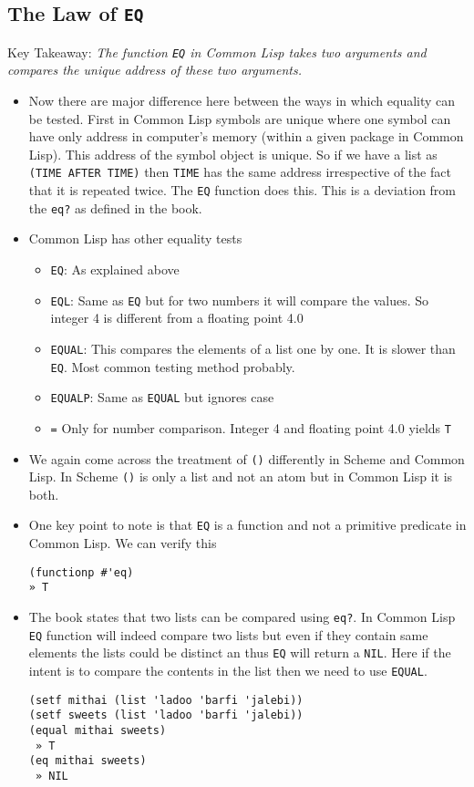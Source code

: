 \documentclass[11pt]{article}
\begin{document}
\subsection{The Law of \texttt{EQ}}
\label{sec:org8db2bc8}
Key Takeaway:
\emph{The function \texttt{EQ} in Common Lisp takes two arguments and compares the unique address of these two arguments.}

\vspace{1em}

\begin{itemize}
\item Now there are major difference here between the ways in which equality can be tested. First in Common Lisp symbols
are unique where one symbol can have only address in computer's memory (within a given package in Common Lisp).
This address of the symbol object is unique. So if we have a list as \texttt{(TIME AFTER TIME)} then \texttt{TIME} has the same
address irrespective of the fact that it is repeated twice. The \texttt{EQ} function does this. This is a deviation from the
\texttt{eq?} as defined in the book.
\item Common Lisp has other equality tests
\begin{itemize}
\item \texttt{EQ}: As explained above
\item \texttt{EQL}: Same as \texttt{EQ} but for two numbers it will compare the values. So integer 4 is different from a floating
point 4.0
\item \texttt{EQUAL}: This compares the elements of a list one by one. It is slower than \texttt{EQ}. Most common testing method
probably.
\item \texttt{EQUALP}: Same as \texttt{EQUAL} but ignores case
\item \texttt{=} Only for number comparison. Integer 4 and floating point 4.0 yields \texttt{T}
\end{itemize}
\item We again come across the treatment of \texttt{()} differently in Scheme and Common Lisp. In Scheme \texttt{()} is only a list and
not an atom but in Common Lisp it is both.
\item One key point to note is that \texttt{EQ} is a function and not a primitive predicate in Common Lisp. We can verify this
\begin{verbatim}
(functionp #'eq)
» T

\end{verbatim}
\item The book states that two lists can be compared using \texttt{eq?}. In Common Lisp \texttt{EQ} function will indeed compare two
lists but even if they contain same elements the lists could be distinct an thus \texttt{EQ} will return a \texttt{NIL}. Here if
the intent is to compare the contents in the list then we need to use \texttt{EQUAL}.
\begin{verbatim}
(setf mithai (list 'ladoo 'barfi 'jalebi))
(setf sweets (list 'ladoo 'barfi 'jalebi))
(equal mithai sweets)
 » T
(eq mithai sweets)
 » NIL


\end{verbatim}
\end{itemize}
\end{document}
